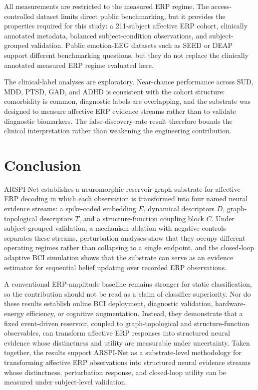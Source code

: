 \documentclass[journal]{IEEEtran}
\begin{document}
All measurements are restricted to the measured ERP regime. The access-controlled dataset limits direct public benchmarking, but it provides the properties required for this study: a 211-subject affective ERP cohort, clinically annotated metadata, balanced subject-condition observations, and subject-grouped validation. Public emotion-EEG datasets such as SEED or DEAP support different benchmarking questions, but they do not replace the clinically annotated measured ERP regime evaluated here.

The clinical-label analyses are exploratory. Near-chance performance across SUD, MDD, PTSD, GAD, and ADHD is consistent with the cohort structure: comorbidity is common, diagnostic labels are overlapping, and the substrate was designed to measure affective ERP evidence streams rather than to validate diagnostic biomarkers. The false-discovery-rate result therefore bounds the clinical interpretation rather than weakening the engineering contribution.

\section{Conclusion}
ARSPI-Net establishes a neuromorphic reservoir-graph substrate for affective ERP decoding in which each observation is transformed into four named neural evidence streams: a spike-coded embedding $E$, dynamical descriptors $D$, graph-topological descriptors $T$, and a structure-function coupling block $C$. Under subject-grouped validation, a mechanism ablation with negative controls separates these streams, perturbation analyses show that they occupy different operating regimes rather than collapsing to a single endpoint, and the closed-loop adaptive BCI simulation shows that the substrate can serve as an evidence estimator for sequential belief updating over recorded ERP observations.

A conventional ERP-amplitude baseline remains stronger for static classification, so the contribution should not be read as a claim of classifier superiority. Nor do these results establish online BCI deployment, diagnostic validation, hardware-energy efficiency, or cognitive augmentation. Instead, they demonstrate that a fixed event-driven reservoir, coupled to graph-topological and structure-function observables, can transform affective ERP responses into structured neural evidence whose distinctness and utility are measurable under uncertainty. Taken together, the results support ARSPI-Net as a substrate-level methodology for transforming affective ERP observations into structured neural evidence streams whose distinctness, perturbation response, and closed-loop utility can be measured under subject-level validation.
\end{document}
